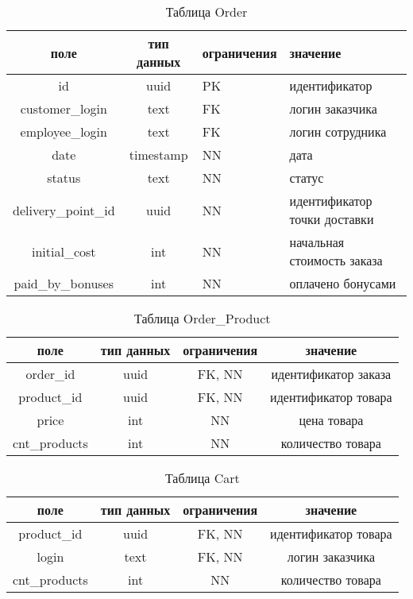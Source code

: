 \begin{table}[H]
	\begin{center}
		\caption{Таблица Order}
		\label{tbl:order}
		\begin{tabular}{|c|c|m{30mm}|p{40mm}|}
			\hline
			поле & тип данных & ограничения & значение \\
			\hline
			id & uuid  & PK & идентификатор \\
			\hline
			customer\_login & text & FK & логин заказчика \\
			\hline
			employee\_login & text & FK & логин сотрудника \\
			\hline
			date & timestamp & NN & дата \\
			\hline
			status & text & NN & статус \\
			\hline
			delivery\_point\_id & uuid & NN & идентификатор точки доставки \\
			\hline
			initial\_cost & int & NN & начальная стоимость заказа \\
			\hline
			paid\_by\_bonuses & int & NN & оплачено бонусами \\
			\hline
		\end{tabular}
	\end{center}	
\end{table}

\begin{table}[H]
	\begin{center}
		\caption{Таблица Order\_Product}
		\label{tbl:op}
		\begin{tabular}{|c|c|c|c|}
			\hline
			поле & тип данных & ограничения & значение \\
			\hline
			order\_id & uuid  & FK, NN & идентификатор заказа \\
			\hline
			product\_id & uuid & FK, NN & идентификатор товара \\
			\hline
			price & int & NN & цена товара \\
			\hline
			cnt\_products & int & NN & количество товара \\
			\hline
		\end{tabular}
	\end{center}	
\end{table}

\begin{table}[H]
	\begin{center}
		\caption{Таблица Cart}
		\label{tbl:cart}
		\begin{tabular}{|c|c|c|c|}
			\hline
			поле & тип данных & ограничения & значение \\
			\hline
			product\_id & uuid & FK, NN & идентификатор товара \\
			\hline
			login & text & FK, NN & логин заказчика \\
			\hline
			cnt\_products & int & NN & количество товара \\
			\hline
		\end{tabular}
	\end{center}	
\end{table}


